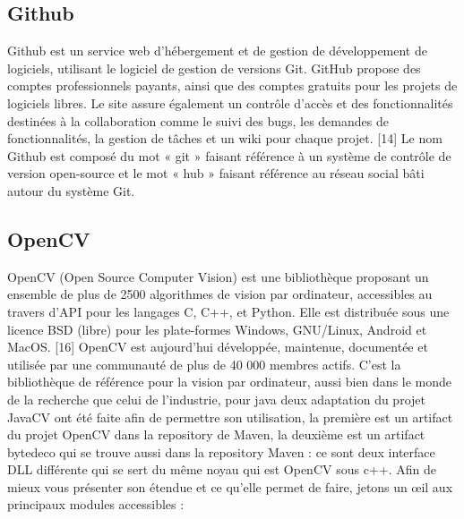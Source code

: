 \documentclass[11pt]{report}
\begin{document}
\subsection{Github}
Github est un service web d'hébergement et de gestion de développement de
logiciels, utilisant le logiciel de gestion de versions Git. GitHub propose des comptes
professionnels payants, ainsi que des comptes gratuits pour les projets de logiciels libres. Le
site assure également un contrôle d'accès et des fonctionnalités destinées à la collaboration
comme le suivi des bugs, les demandes de fonctionnalités, la gestion de tâches et un wiki
pour chaque projet. [14]
Le nom Github est composé du mot « git » faisant référence à un système de
contrôle de version open-source et le mot « hub » faisant référence au réseau social bâti
autour du système Git.
\subsection{OpenCV}
OpenCV (Open Source Computer Vision) est une bibliothèque proposant un
ensemble de plus de 2500 algorithmes de vision par ordinateur, accessibles au travers d'API
pour les langages C, C++, et Python. Elle est distribuée sous une licence BSD (libre) pour les
plate-formes Windows, GNU/Linux, Android et MacOS. [16]
OpenCV est aujourd'hui développée, maintenue, documentée et utilisée par une
communauté de plus de 40 000 membres actifs. C'est la bibliothèque de référence pour la
vision par ordinateur, aussi bien dans le monde de la recherche que celui de l'industrie, pour
java deux adaptation du projet JavaCV ont été faite afin de permettre son utilisation, la
première est un artifact du projet OpenCV dans la repository de Maven, la deuxième est un
artifact bytedeco qui se trouve aussi dans la repository Maven : ce sont deux interface DLL
différente qui se sert du même noyau qui est OpenCV sous c++.
Afin de mieux vous présenter son étendue et ce qu'elle permet de faire, jetons un
œil aux principaux modules accessibles :
\end{document}
